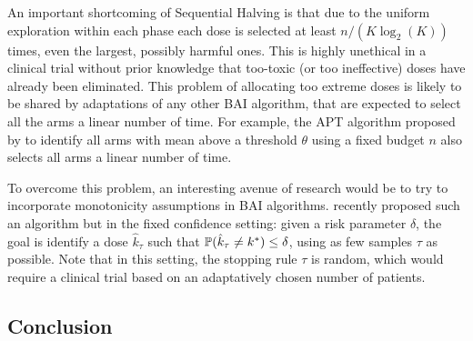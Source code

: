 An important shortcoming of Sequential Halving is that due to the uniform exploration within each phase each dose is selected at least $n / (K\log_2(K))$ times, even the largest, possibly harmful ones. This is highly unethical in a  clinical trial without prior knowledge that too-toxic (or too ineffective) doses have already been eliminated. This problem of allocating too extreme doses is likely to be shared by adaptations of any other BAI algorithm, that are expected to select all the arms a linear number of time. For example, the APT algorithm proposed by \cite{Locatelli16Thres} to identify all arms with mean above a threshold $\theta$ using a fixed budget $n$ also selects all arms a linear number of time.

To overcome this problem, an interesting avenue of research would be to try to incorporate monotonicity assumptions in BAI algorithms. \cite{Garivier17DF} recently proposed such an algorithm but in the fixed confidence setting: given a risk parameter $\delta$, the goal is identify a dose $\hat{k}_\tau$  such that $\mathbb{P}(\hat{k}_\tau \neq k^*) \leq \delta$, using as few samples $\tau$ as possible. Note that in this setting, the stopping rule $\tau$ is random, which would require a clinical trial based on an adaptatively chosen number of patients.




\subsection{Conclusion}\label{sec:Conclusion}

